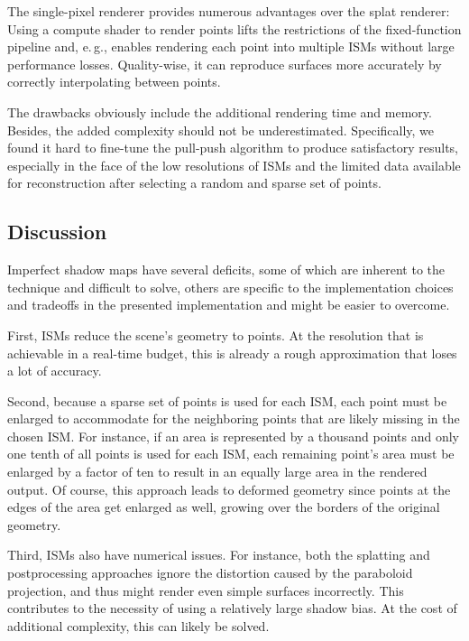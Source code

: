 The single-pixel renderer provides numerous advantages over the splat renderer: Using a compute shader to render points lifts the restrictions of the fixed-function pipeline and, e.\,g., enables rendering each point into multiple ISMs without large performance losses. Quality-wise, it can reproduce surfaces more accurately by correctly interpolating between points.

The drawbacks obviously include the additional rendering time and memory. Besides, the added complexity should not be underestimated. Specifically, we found it hard to fine-tune the pull-push algorithm to produce satisfactory results, especially in the face of the low resolutions of ISMs and the limited data available for reconstruction after selecting a random and sparse set of points.



\subsection{Discussion}
\label{sec:results:ism:discussion}

Imperfect shadow maps have several deficits, some of which are inherent to the technique and difficult to solve, others are specific to the implementation choices and tradeoffs in the presented implementation and might be easier to overcome.

First, ISMs reduce the scene's geometry to points. At the resolution that is achievable in a real-time budget, this is already a rough approximation that loses a lot of accuracy.

Second, because a sparse set of points is used for each ISM, each point must be enlarged to accommodate for the neighboring points that are likely missing in the chosen ISM. For instance, if an area is represented by a thousand points and only one tenth of all points is used for each ISM, each remaining point's area must be enlarged by a factor of ten to result in an equally large area in the rendered output. Of course, this approach leads to deformed geometry since points at the edges of the area get enlarged as well, growing over the borders of the original geometry.

Third, ISMs also have numerical issues. For instance, both the splatting and postprocessing approaches ignore the distortion caused by the paraboloid projection, and thus might render even simple surfaces incorrectly. This contributes to the necessity of using a relatively large shadow bias. At the cost of additional complexity, this can likely be solved.

